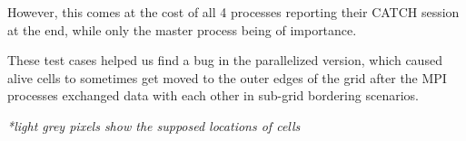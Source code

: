 \documentclass[11pt]{article}
\begin{document}
However, this comes at the cost of all 4 processes reporting their CATCH session at the end, while only the master process being of importance.

These test cases helped us find a bug in the parallelized version, which caused alive cells to sometimes get moved to the outer edges of the grid after the MPI processes exchanged data with each other in sub-grid bordering scenarios.
\begin{center}

    \vspace{-0.25cm} %
    \textit{*light grey pixels show the supposed locations of cells}
\end{center}
\end{document}
